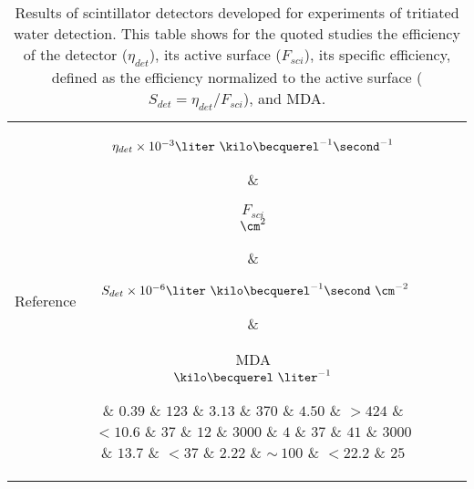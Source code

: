 \begin{table}[htbp]
\centering{}%
\begin{tabular}{lcrcc}
\toprule 
Reference & \parbox{5em}{$\eta_{det}\times10^{-3}\\\liter~\kilo\becquerel^{-1}\second^{-1}$}  & \parbox{3.5em}{\raggedleft $F_{sci}$\\ $\cm^2$}  & \parbox{6.5em}{$~S_{det}\times 10^{-6}\\\liter~\kilo\becquerel^{-1}\second~\cm^{-2}$} &  \parbox{3.5em}{MDA\\$\kilo\becquerel~\liter^{-1}$} \tabularnewline
\midrule
\midrule 
\cite{Muramatsu} & $0.39$ & $123$ & $3.13$ & $370$ \tabularnewline
\cite{Moghissi} & $4.50$ & $>424$ & $<10.6$ & $37$ \tabularnewline
\cite{Osborne} & $12$ & $3000$ & $4$ & $37$ \tabularnewline
\cite{Ratnakaran} & $41$ & $3000$ & $13.7$ & $<37$ \tabularnewline
\cite{Hofstetter1} & $2.22$ & $\sim~100$ & $<22.2$ & $25$ \tabularnewline
\bottomrule
\end{tabular}
\caption{Results of scintillator detectors developed for experiments of tritiated water detection. This table shows for the quoted studies the efficiency of the detector ($\eta_{det}$), its active surface ($F_{sci}$), its specific efficiency, defined as the efficiency normalized to the active surface ($S_{det}=\eta_{det}/F_{sci}$), and MDA.}
\label{tab:PlasticScinTritium}
\end{table}